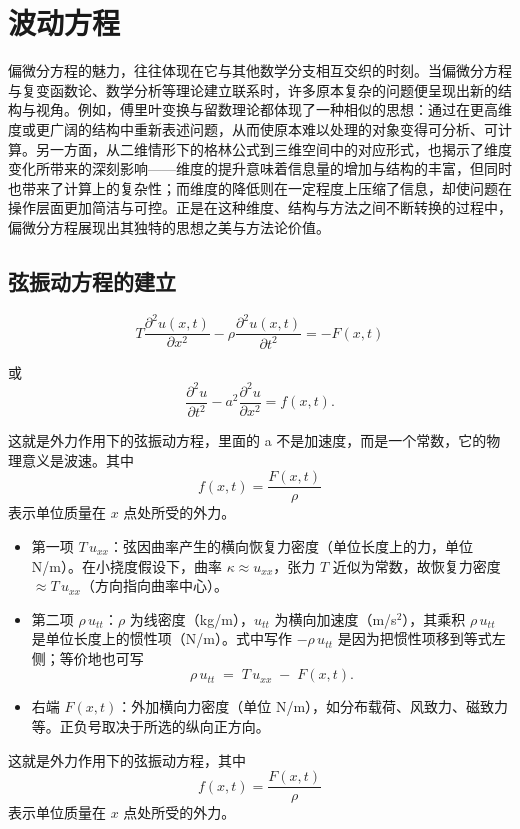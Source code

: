 

\chapter{波动方程}
\begin{dxtips}
   偏微分方程的魅力，往往体现在它与其他数学分支相互交织的时刻。当偏微分方程与复变函数论、数学分析等理论建立联系时，许多原本复杂的问题便呈现出新的结构与视角。例如，傅里叶变换与留数理论都体现了一种相似的思想：通过在更高维度或更广阔的结构中重新表述问题，从而使原本难以处理的对象变得可分析、可计算。另一方面，从二维情形下的格林公式到三维空间中的对应形式，也揭示了维度变化所带来的深刻影响——维度的提升意味着信息量的增加与结构的丰富，但同时也带来了计算上的复杂性；而维度的降低则在一定程度上压缩了信息，却使问题在操作层面更加简洁与可控。正是在这种维度、结构与方法之间不断转换的过程中，偏微分方程展现出其独特的思想之美与方法论价值。
\end{dxtips}
\section{弦振动方程的建立}
\begin{definition}[弦振动方程]
    

\begin{equation}
T \frac{\partial^2 u(x,t)}{\partial x^2} - \rho \frac{\partial^2 u(x,t)}{\partial t^2} = -F(x,t) \tag{1.13}
\end{equation}


或
\begin{equation}
\frac{\partial^2 u}{\partial t^2} - a^2 \frac{\partial^2 u}{\partial x^2} = f(x,t). \tag{1.14}
\end{equation}

这就是外力作用下的弦振动方程，里面的 a 不是加速度，而是一个常数，它的物理意义是波速。其中
\[
f(x,t) = \frac{F(x,t)}{\rho}
\]
表示单位质量在 $x$ 点处所受的外力。
\end{definition}
\begin{dxtips}
    \begin{itemize}
  \item 第一项 $T\,u_{xx}$：弦因曲率产生的横向恢复力密度（单位长度上的力，单位 N/m）。在小挠度假设下，曲率 $\kappa \approx u_{xx}$，张力 $T$ 近似为常数，故恢复力密度 $\approx T\,u_{xx}$（方向指向曲率中心）。
  \item 第二项 $\rho\,u_{tt}$：$\rho$ 为线密度（kg/m），$u_{tt}$ 为横向加速度（m/s$^2$），其乘积 $\rho\,u_{tt}$ 是单位长度上的惯性项（N/m）。式中写作 $-\rho\,u_{tt}$ 是因为把惯性项移到等式左侧；等价地也可写
  \[
    \rho\,u_{tt}\;=\;T\,u_{xx}\;-\;F(x,t).
  \]
  \item 右端 $F(x,t)$：外加横向力密度（单位 N/m），如分布载荷、风致力、磁致力等。正负号取决于所选的纵向正方向。
\end{itemize}
\end{dxtips}
这就是外力作用下的弦振动方程，其中
\[
f(x,t) = \frac{F(x,t)}{\rho}
\]
表示单位质量在 $x$ 点处所受的外力。

